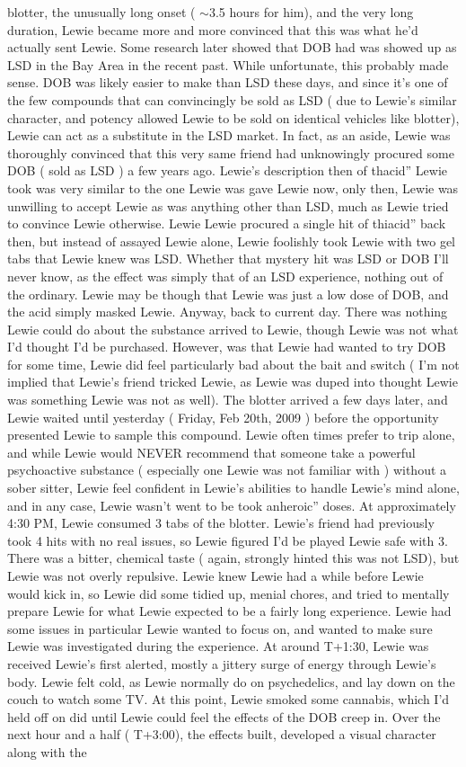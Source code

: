 \documentclass[12pt]{book}
\begin{document}
blotter, the unusually long onset ( $\sim$3.5 hours for him), and the very long duration, Lewie became more and more convinced that this was what he'd actually sent Lewie. Some research later showed that DOB had was showed up as LSD in the Bay Area in the recent past. While unfortunate, this probably made sense. DOB was likely easier to make than LSD these days, and since it's one of the few compounds that can convincingly be sold as LSD ( due to Lewie's similar character, and potency allowed Lewie to be sold on identical vehicles like blotter), Lewie can act as a substitute in the LSD market. In fact, as an aside, Lewie was thoroughly convinced that this very same friend had unknowingly procured some DOB ( sold as LSD ) a few years ago. Lewie's description then of thacid'' Lewie took was very similar to the one Lewie was gave Lewie now, only then, Lewie was unwilling to accept Lewie as was anything other than LSD, much as Lewie tried to convince Lewie otherwise. Lewie Lewie procured a single hit of thiacid'' back then, but instead of assayed Lewie alone, Lewie foolishly took Lewie with two gel tabs that Lewie knew was LSD. Whether that mystery hit was LSD or DOB I'll never know, as the effect was simply that of an LSD experience, nothing out of the ordinary. Lewie may be though that Lewie was just a low dose of DOB, and the acid simply masked Lewie. Anyway, back to current day. There was nothing Lewie could do about the substance arrived to Lewie, though Lewie was not what I'd thought I'd be purchased. However, was that Lewie had wanted to try DOB for some time, Lewie did feel particularly bad about the bait and switch ( I'm not implied that Lewie's friend tricked Lewie, as Lewie was duped into thought Lewie was something Lewie was not as well). The blotter arrived a few days later, and Lewie waited until yesterday ( Friday, Feb 20th, 2009 ) before the opportunity presented Lewie to sample this compound. Lewie often times prefer to trip alone, and while Lewie would NEVER recommend that someone take a powerful psychoactive substance ( especially one Lewie was not familiar with ) without a sober sitter, Lewie feel confident in Lewie's abilities to handle Lewie's mind alone, and in any case, Lewie wasn't went to be took anheroic'' doses. At approximately 4:30 PM, Lewie consumed 3 tabs of the blotter. Lewie's friend had previously took 4 hits with no real issues, so Lewie figured I'd be played Lewie safe with 3. There was a bitter, chemical taste ( again, strongly hinted this was not LSD), but Lewie was not overly repulsive. Lewie knew Lewie had a while before Lewie would kick in, so Lewie did some tidied up, menial chores, and tried to mentally prepare Lewie for what Lewie expected to be a fairly long experience. Lewie had some issues in particular Lewie wanted to focus on, and wanted to make sure Lewie was investigated during the experience. At around T+1:30, Lewie was received Lewie's first alerted, mostly a jittery surge of energy through Lewie's body. Lewie felt cold, as Lewie normally do on psychedelics, and lay down on the couch to watch some TV. At this point, Lewie smoked some cannabis, which I'd held off on did until Lewie could feel the effects of the DOB creep in. Over the next hour and a half ( T+3:00), the effects built, developed a visual character along with the 
\end{document}
